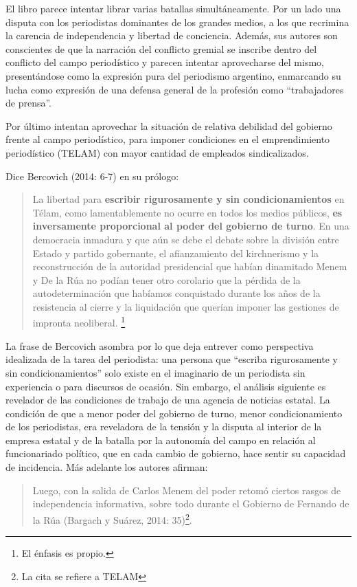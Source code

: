 {El libro parece intentar librar varias batallas simultáneamente. Por un lado una disputa con los periodistas dominantes de los grandes medios, a los que recrimina la carencia de independencia y libertad de conciencia. Además, sus autores son conscientes de que la narración del conflicto gremial se inscribe dentro del conflicto del campo periodístico y parecen intentar aprovecharse del mismo, presentándose como la expresión pura del periodismo argentino, enmarcando su lucha como expresión de una defensa general de la profesión como ``trabajadores de prensa''.

Por último intentan aprovechar la situación de relativa debilidad del gobierno frente al campo periodístico, para imponer condiciones en el emprendimiento periodístico (TELAM) con mayor cantidad de empleados sindicalizados.

Dice Bercovich (2014: 6-7) en su prólogo:

\begin{quote}
La libertad para \textbf{escribir rigurosamente y sin condicionamientos} en Télam, como lamentablemente no ocurre en todos los medios públicos, \textbf{es inversamente proporcional al poder del gobierno de turno}. En una democracia inmadura y que aún se debe el debate sobre la división entre Estado y partido gobernante, el afianzamiento del kirchnerismo y la reconstrucción de la autoridad presidencial que habían dinamitado Menem y De la Rúa no podían tener otro corolario que la pérdida de la autodeterminación que habíamos conquistado durante los años de la resistencia al cierre y la liquidación que querían imponer las gestiones de impronta neoliberal. \footnote{El énfasis es propio.}
\end{quote}

La frase de Bercovich asombra por lo que deja entrever como perspectiva idealizada de la tarea del periodista: una persona que ``escriba rigurosamente y sin condicionamientos'' solo existe en el imaginario de un periodista sin experiencia o para discursos de ocasión. Sin embargo, el análisis siguiente es revelador de las condiciones de trabajo de una agencia de noticias estatal. La condición de que a menor poder del gobierno de turno, menor condicionamiento de los periodistas, era reveladora de la tensión y la disputa al interior de la empresa estatal y de la batalla por la autonomía del campo en relación al funcionariado político, que en cada cambio de gobierno, hace sentir su capacidad de incidencia. Más adelante los autores afirman:

\begin{quote}
Luego, con la salida de Carlos Menem del poder retomó ciertos rasgos de independencia informativa, sobre todo durante el Gobierno de Fernando de la Rúa (Bargach y Suárez, 2014: 35)\footnote{La cita se refiere a TELAM}.
\end{quote}

}
